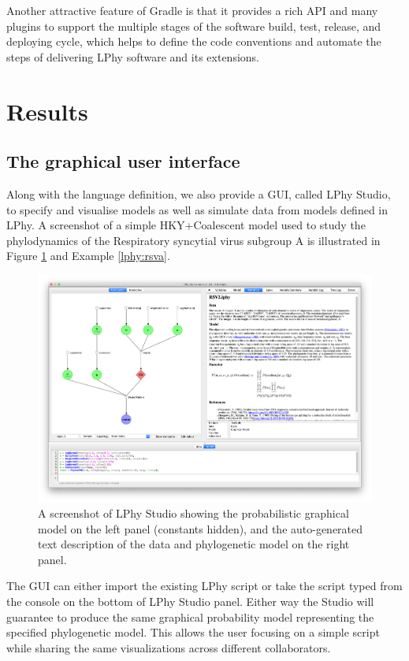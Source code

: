 \documentclass[10pt,letterpaper,table]{article}
\begin{document}
{Another attractive feature of Gradle is that it provides a rich API and many plugins to support the multiple stages of the software build, test, release, and deploying cycle, which helps to define the code conventions and automate the steps of delivering LPhy software and its extensions.  

\section{Results}

\subsection{The graphical user interface}
Along with the language definition, we also provide a GUI, called LPhy Studio, to specify and visualise models as well as simulate data from models defined in LPhy. A screenshot of a simple HKY+Coalescent model used to study the phylodynamics of the Respiratory syncytial virus subgroup A \cite{zlateva2004molecular} is illustrated in Figure \ref{fig:lphystudio} and Example \ref{lphy:rsva}.

\begin{figure}
  \includegraphics[width=\textwidth]{figs/lphystudio_screenshot.png}
  \caption{A screenshot of LPhy Studio showing the probabilistic graphical model 
  on the left panel (constants hidden), and the auto-generated text description of the data and phylogenetic model on the right panel.} 
  \label{fig:lphystudio}
\end{figure}

The GUI can either import the existing LPhy script or take the script typed from the console on the bottom of LPhy Studio panel. Either way the Studio will guarantee to produce the same graphical probability model representing the specified phylogenetic model. 
This allows the user focusing on a simple script while sharing the same visualizations across different collaborators.  

}
\end{document}
